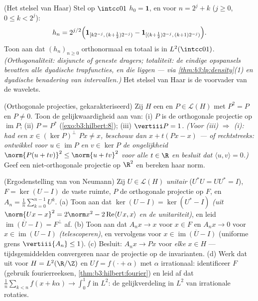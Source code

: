 \begin{exercise}[$\star\star\star$]\label{exo:b3:hilbert:10}
(Het stelsel van Haar) Stel op $\intcc01$ $h_{0} = \mathbf 1$,
en voor $n = 2^j + k$ ($j \geq 0$, $0 \leq k < 2^j$):
\[
h_n = 2^{j/2}\Bigl(\mathbf 1_{[k2^{-j},\,(k +
\frac12)2^{-j})} - \mathbf 1_{[(k+\frac12)2^{-j},\,(k+1)2^{-j})}
\Bigr).
\]
Toon aan dat $(h_n)_{n\geq0}$ orthonormaal en totaal is in
$L^2(\intcc01)$. \emph{(Orthogonaliteit: disjuncte of
geneste dragers; totaliteit: de eindige opspansels bevatten alle
dyadische trapfuncties, en die liggen  --- via
\cref{thm:b3:lp:density}(1) en dyadische benadering van
intervallen.)} Het stelsel van Haar is de voorvader van de
wavelets.
\end{exercise}

\begin{exercise}[$\star\star$]\label{exo:b3:hilbert:11}
(Orthogonale projecties, gekarakteriseerd) Zij $H$ een
 en $P \in \mathcal L(H)$ met $P^2 = P$ en $P \neq
0$. Toon de gelijkwaardigheid aan van:
(i) $P$ is de orthogonale projectie op $\operatorname{im}P$;
(ii) $P = P^*$ (\cref{exo:b3:hilbert:8});
(iii) $\vertiii P = 1$.
\emph{(Voor (iii) $\Rightarrow$ (i): had een $x \in (\ker
P)^\perp$ $Px \neq x$, beschouw dan $x + t(Px - x)$ --- of
rechtstreeks: ontwikkel voor $u \in \operatorname{im}P$ en $v \in
\ker P$ de ongelijkheid $\norm{P(u + tv)}^2 \leq \norm{u +
tv}^2$ voor alle $t \in \R$ en besluit dat $\langle u, v\rangle =
0$.)}
Geef een niet-orthogonale projectie op $\R^2$ en bereken haar
norm.
\end{exercise}

\begin{exercise}[$\star\star\star$]\label{exo:b3:hilbert:12}
(Ergodenstelling van von Neumann) Zij $U \in \mathcal L(H)$
\emph{unitair} ($U^*U = UU^* = I$), $F = \ker(U - I)$ de vaste
ruimte, $P$ de orthogonale projectie op $F$, en $A_n =
\frac1n\sum_{k=0}^{n-1}U^k$.
(a) Toon aan dat $\ker(U - I) = \ker(U^* - I)$ \emph{(uit
$\norm{Ux - x}^2 = 2\norm x^2 - 2\operatorname{Re}\langle Ux,
x\rangle$ en de unitariteit)}, en leid
$\overline{\operatorname{im}(U - I)} = F^\perp$ af.
(b) Toon aan dat $A_nx \to x$ voor $x \in F$ en $A_nx \to 0$ voor
$x \in \operatorname{im}(U - I)$ \emph{(telescoperen)}, en
vervolgens voor $x \in \overline{\operatorname{im}(U - I)}$
(uniforme grens $\vertiii{A_n} \leq 1$).
(c) Besluit: $A_nx \to Px$ voor \emph{elke} $x \in H$ ---
tijdsgemiddelden convergeren naar de projectie op de
invarianten.
(d) Werk dat uit voor $H = L^2(\R/\Z)$ en $Uf = f(\cdot +
\alpha)$ met $\alpha$ irrationaal: identificeer $F$ (gebruik
fourierreeksen, \cref{thm:b3:hilbert:fourier}) en leid af dat
$\frac1n\sum_{k<n}f(x + k\alpha) \to \int_0^1f$ in $L^2$: de
gelijkverdeling in $L^2$ van irrationale rotaties.
\end{exercise}

